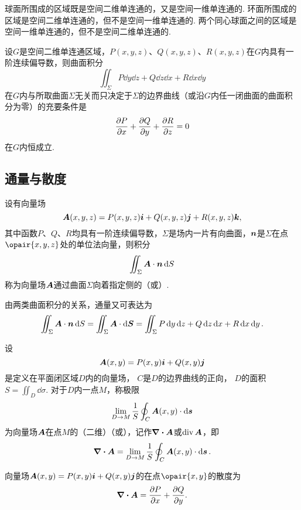 \begin{example}
球面所围成的区域既是空间二维单连通的，又是空间一维单连通的.
环面所围成的区域是空间二维单连通的，但不是空间一维单连通的.
两个同心球面之间的区域是空间一维单连通的，但不是空间二维单连通的.
\end{example}

\begin{theorem}\label{theorem:线积分与面积分.沿任意闭曲面的曲面积分为零的条件}
设\(G\)是空间二维单连通区域，\(P(x,y,z)\)、\(Q(x,y,z)\)、\(R(x,y,z)\)在\(G\)内具有一阶连续偏导数，则曲面积分\[
\iint_{\Sigma} P\dd{y}\dd{z}+Q\dd{z}\dd{x}+R\dd{x}\dd{y}
\]在\(G\)内与所取曲面\(\Sigma\)无关而只决定于\(\Sigma\)的边界曲线（或沿\(G\)内任一闭曲面的曲面积分为零）的充要条件是\[
\pdv{P}{x}+\pdv{Q}{y}+\pdv{R}{z} = 0
\]在\(G\)内恒成立.
\end{theorem}

\subsection{通量与散度}
\begin{definition}
设有向量场\[
\boldsymbol{A}(x,y,z)=P(x,y,z)\boldsymbol{i}+Q(x,y,z)\boldsymbol{j}+R(x,y,z)\boldsymbol{k},
\]其中函数\(P\)、\(Q\)、\(R\)均具有一阶连续偏导数，\(\Sigma\)是场内一片有向曲面，\(\boldsymbol{n}\)是\(\Sigma\)在点\(\opair{x,y,z}\)处的单位法向量，则积分\[
\iint_{\Sigma}{\boldsymbol{A}\cdot\boldsymbol{n}\dd{S}}
\]称为向量场\(\boldsymbol{A}\)通过曲面\(\Sigma\)向着指定侧的（或）.
\end{definition}
由两类曲面积分的关系，通量又可表达为\[
\iint_{\Sigma} \boldsymbol{A}\cdot\boldsymbol{n}\dd{S}
=\iint_{\Sigma} \boldsymbol{A}\cdot\dd{\boldsymbol{S}}
=\iint_{\Sigma} P\dd{y}\dd{z}+Q\dd{z}\dd{x}+R\dd{x}\dd{y}.
\]

\begin{definition}[平面上的散度]
\def\defofdiv{\lim\limits_{D \to M} \frac{1}{S} \oint_C \mat{A}(x,y) \cdot \dd{\mat{s}}}%
设\[
\boldsymbol{A}(x,y)=P(x,y)\boldsymbol{i}+Q(x,y)\boldsymbol{j}
\]是定义在平面闭区域\(D\)内的向量场，
\(C\)是\(D\)的边界曲线的正向，
\(D\)的面积\(S = \iint_{D} \dd{\sigma}\).
对于\(D\)内一点\(M\)，称极限\[
\defofdiv
\]为向量场\(\boldsymbol{A}\)在点\(M\)的（二维）（或），记作\(\div{\boldsymbol{A}}\)或\(\operatorname{div}\boldsymbol{A}\)，即\[
\div{\mat{A}} = \defofdiv.
\]
\end{definition}

\begin{theorem}
向量场\(\boldsymbol{A}(x,y)=P(x,y)\boldsymbol{i}+Q(x,y)\boldsymbol{j}\)的在点\(\opair{x,y}\)的散度为\[
\div{\boldsymbol{A}} = \pdv{P}{x}+\pdv{Q}{y}.
\]
\end{theorem}

